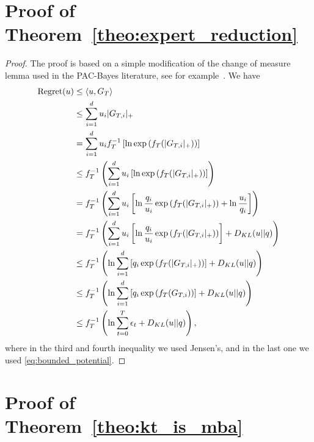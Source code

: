 \section{Proof of Theorem~\ref{theo:expert_reduction}}
\begin{proof}
The proof is based on a simple modification of the change of measure lemma used in the PAC-Bayes literature, see for example~\citet{McAllester13}.
We have
\begin{align*}
\operatorname{Regret}(u) 
& \leq \langle u, G_T \rangle \\
& \leq \sum_{i=1}^d u_i |G_{T,i}|_+ \\
& = \sum_{i=1}^d u_i f_T^{-1}\left[\ln \exp\left(f_T(|G_{T,i}|_+)\right)\right] \\
& \leq f_T^{-1}\left(\sum_{i=1}^d u_i \left[\ln \exp\left(f_T(|G_{T,i}|_+)\right)\right]\right) \\
& = f_T^{-1}\left(\sum_{i=1}^d u_i \left[\ln \frac{q_i}{u_i}\exp\left(f_T(|G_{T,i}|_+)\right)+ \ln\frac{u_i}{q_i}\right]\right) \\
& = f_T^{-1}\left(\sum_{i=1}^d u_i \left[\ln \frac{q_i}{u_i}\exp\left(f_T(|G_{T,i}|_+)\right)\right] + D_{KL}(u||q)\right) \\
& \leq f_T^{-1}\left(\ln \sum_{i=1}^d \left[q_i \exp\left(f_T(|G_{T,i}|_+)\right)\right] + D_{KL}(u||q)\right) \\
& \leq f_T^{-1}\left(\ln \sum_{i=1}^d \left[q_i \exp\left(f_T(G_{T,i})\right)\right] + D_{KL}(u||q)\right) \\
& \leq f_T^{-1}\left(\ln \sum_{t=0}^T \epsilon_t + D_{KL}(u||q)\right),
\end{align*}
where in the third and fourth inequality we used Jensen's, and in the last one
we used \eqref{eq:bounded_potential}.
\end{proof}

\section{Proof of Theorem~\ref{theo:kt_is_mba}}

